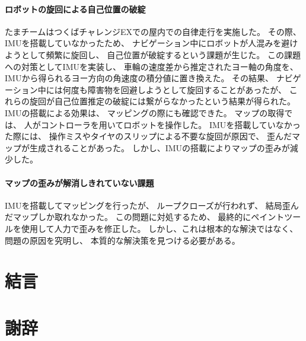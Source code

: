 \documentclass[twocolumn,9pt]{jsproceedings}
\begin{document}
\paragraph{ロボットの旋回による自己位置の破綻}

たまチームはつくばチャレンジEXでの屋内での自律走行を実施した。
その際、IMUを搭載していなかったため、
ナビゲーション中にロボットが人混みを避けようとして頻繁に旋回し、
自己位置が破綻するという課題が生じた。
この課題への対策としてIMUを実装し、
車輪の速度差から推定されたヨー軸の角度を、
IMUから得られるヨー方向の角速度の積分値に置き換えた。
その結果、
ナビゲーション中には何度も障害物を回避しようとして旋回することがあったが、
これらの旋回が自己位置推定の破綻には繋がらなかったという結果が得られた。
IMUの搭載による効果は、
マッピングの際にも確認できた。
マップの取得では、
人がコントローラを用いてロボットを操作した。
IMUを搭載していなかった際には、
操作ミスやタイヤのスリップによる不要な旋回が原因で、
歪んだマップが生成されることがあった。
しかし、IMUの搭載によりマップの歪みが減少した。

\paragraph{マップの歪みが解消しきれていない課題}

IMUを搭載してマッピングを行ったが、
ループクローズが行われず、
結局歪んだマップしか取れなかった。
この問題に対処するため、
最終的にペイントツールを使用して人力で歪みを修正した。
しかし、これは根本的な解決ではなく、
問題の原因を究明し、
本質的な解決策を見つける必要がある。

\section{結言}

\section*{謝辞}

\end{document}
